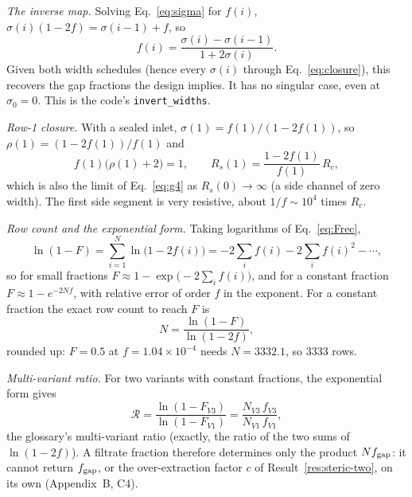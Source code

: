 \emph{The inverse map.} Solving Eq.~\eqref{eq:sigma} for $f(i)$,
$\sigma(i)(1-2f)=\sigma(i-1)+f$, so
\begin{equation}
f(i)=\frac{\sigma(i)-\sigma(i-1)}{1+2\sigma(i)} .
\label{eq:inverse}
\end{equation}
Given both width schedules (hence every $\sigma(i)$ through Eq.~\eqref{eq:closure}), this
recovers the gap fractions the design implies. It has no singular case, even at $\sigma_0=0$.
This is the code's \texttt{invert\_widths}.

\emph{Row-1 closure.} With a sealed inlet, $\sigma(1)=f(1)/(1-2f(1))$, so
$\rho(1)=(1-2f(1))/f(1)$ and
\begin{equation}
f(1)\big(\rho(1)+2\big)=1 ,\qquad R_s(1)=\frac{1-2f(1)}{f(1)}\,R_c ,
\end{equation}
which is also the limit of Eq.~\eqref{eq:g4} as $R_s(0)\to\infty$ (a side channel of zero
width). The first side segment is very resistive, about $1/f\sim10^4$ times $R_c$.

\emph{Row count and the exponential form.} Taking logarithms of Eq.~\eqref{eq:Frec},
\begin{equation}
\ln(1-F)=\sum_{i=1}^{N}\ln\big(1-2f(i)\big)=-2\sum_i f(i)-2\sum_i f(i)^2-\cdots ,
\end{equation}
so for small fractions $F\approx1-\exp\!\big(-2\sum_i f(i)\big)$, and for a constant fraction
$F\approx1-e^{-2Nf}$, with relative error of order $f$ in the exponent. For a constant fraction
the exact row count to reach $F$ is
\begin{equation}
N=\frac{\ln(1-F)}{\ln(1-2f)} ,
\label{eq:Nconst}
\end{equation}
rounded up: $F=0.5$ at $f=1.04\times10^{-4}$ needs $N=3332.1$, so $3333$ rows.

\emph{Multi-variant ratio.} For two variants with constant fractions, the exponential form gives
\begin{equation}
\mathcal{R}=\frac{\ln(1-F_{V3})}{\ln(1-F_{V1})}=\frac{N_{V3}\,f_{V3}}{N_{V1}\,f_{V1}} ,
\end{equation}
the glossary's multi-variant ratio (exactly, the ratio of the two sums of $\ln(1-2f)$). A
filtrate fraction therefore determines only the product $Nf_{\mathrm{gap}}$: it cannot return $f_{\mathrm{gap}}$, or
the over-extraction factor $c$ of Result~\ref{res:steric-two}, on its own (Appendix~B, C4).

\label{res:march-outlet}

